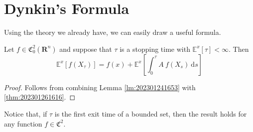 \section{Dynkin's Formula}

Using the theory we already have, we can easily draw a useful formula.

\begin{theorem}
    Let $f \in \mathfrak{C}_0^2(\textbf{R}^n)$ and suppose that $\tau$ is a stopping time with $\mathbb{E}^x[\tau] < \infty$. Then 
    \begin{equation}\label{thm:dynkin-formula}
        \mathbb{E}^x [f(X_\tau)] = f(x) + \mathbb{E}^x \left[ \int_0^{\tau} A~f(X_s) ~\mathrm{d}s \right]
    \end{equation}
\end{theorem}

\begin{proof}
    Follows from combining Lemma \ref{lm:202301241653} with \eqref{thm:202301261616}.
\end{proof}

Notice that, if $\tau$ is the first exit time of a bounded set, then the result holds for any function $f \in \mathfrak{C}^2$.

